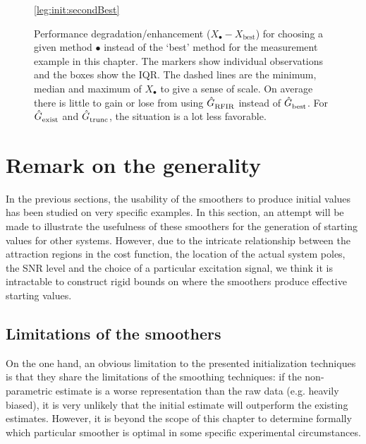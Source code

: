 \begin{figure}
  \centering
  \ref{leg:init:secondBest}
  \setlength{\figurewidth}{0.75\columnwidth}
  \setlength{\figureheight}{0.60\figurewidth}
  
  \caption[Performance degradation/enhancement for selecting the second best model.]{
  Performance degradation/enhancement ($X_{\bullet}-X_{\mathrm{best}}$) for choosing a given method $\bullet$ instead of the `best' method for the measurement example in this chapter.
  The markers show individual observations and the boxes show the \gls{IQR}.
  The dashed lines are the minimum, median and maximum of $X_{\bullet}$ to give a sense of scale.
  On average there is little to gain or lose from using $\hat{G}_{\mathrm{RFIR}}^{\mathrm{}}$ instead of $\hat{G}_{\mathrm{best}}^{\mathrm{}}$.
  For $\hat{G}_{\mathrm{exist}}^{\mathrm{}}$ and $\hat{G}_{\mathrm{trunc}}^{\mathrm{}}$, the situation is a lot less favorable.
  }
  \label{fig:init:histogramEnhancement}
\end{figure}

\section{Remark on the generality}
\label{se:Generality}
In the previous sections, the usability of the smoothers to produce initial values has been studied on very specific examples.
In this section, an attempt will be made to illustrate the usefulness of these smoothers for the generation of starting values for other systems.
However, due to the intricate relationship between the attraction regions in the cost function, the location of the actual system poles, the \gls{SNR} level and the choice of a particular excitation signal, we think it is intractable to construct rigid bounds on where the smoothers produce effective starting values.

\subsection{Limitations of the smoothers}
On the one hand, an obvious limitation to the presented initialization techniques is that they share the limitations of the smoothing techniques: if the non-parametric estimate is a worse representation than the raw data (e.g. heavily biased), it is very unlikely that the initial estimate will outperform the existing estimates.
However, it is beyond the scope of this chapter to determine formally which particular smoother is optimal in some specific experimental circumstances.

